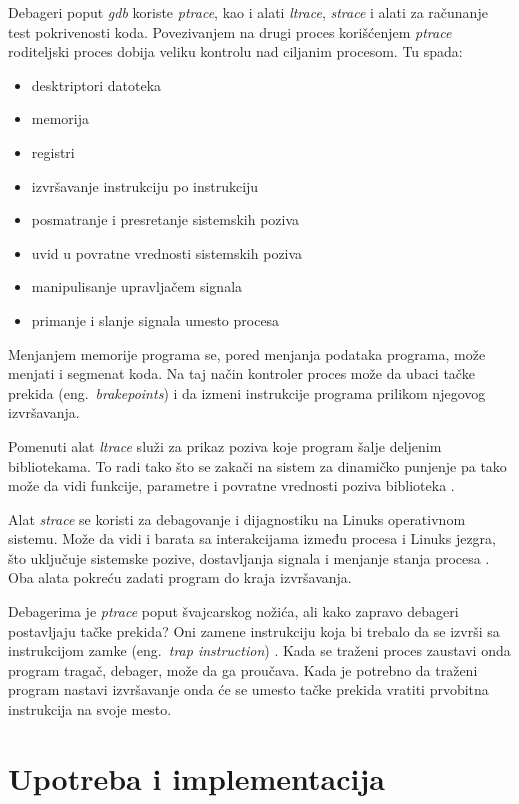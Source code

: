 \documentclass[a4paper]{article}
\begin{document}
Debageri poput \emph{gdb} koriste \emph{ptrace}, kao i alati \emph{ltrace}, \emph{strace} i alati za računanje test pokrivenosti koda.
Povezivanjem na drugi proces korišćenjem \emph{ptrace} roditeljski proces dobija veliku kontrolu nad ciljanim procesom.
Tu spada:
\begin{itemize}
    \item desktriptori datoteka
    \item memorija
    \item registri
    \item izvršavanje instrukciju po instrukciju
    \item posmatranje i presretanje sistemskih poziva
    \item uvid u povratne vrednosti sistemskih poziva
    \item manipulisanje upravljačem signala
    \item primanje i slanje signala umesto procesa
\end{itemize}

Menjanjem memorije programa se, pored menjanja podataka programa, može menjati i segmenat koda. 
Na taj način kontroler proces može da ubaci tačke prekida  (eng.~{\em brakepoints}) i da izmeni instrukcije 
programa prilikom njegovog izvršavanja.

Pomenuti alat \emph{ltrace} služi za prikaz poziva koje program šalje deljenim bibliotekama. To radi tako što se zakači na sistem
za dinamičko punjenje pa tako može da vidi funkcije, parametre i povratne vrednosti poziva biblioteka \cite{lman}.

Alat \emph{strace} se koristi za debagovanje i dijagnostiku na Linuks operativnom sistemu. 
Može da vidi i barata sa interakcijama između procesa i Linuks jezgra, što uključuje sistemske pozive, dostavljanja signala 
i menjanje stanja procesa \cite{sman}.
Oba alata pokreću zadati program do kraja izvršavanja.

Debagerima je \emph{ptrace} poput švajcarskog nožića, ali kako zapravo debageri postavljaju tačke prekida? 
Oni zamene instrukciju koja bi trebalo da se izvrši sa instrukcijom zamke 
(eng.~{\em trap instruction}) \cite{journal}. Kada se traženi proces zaustavi onda program tragač, debager, može da
ga proučava. Kada je potrebno da traženi program nastavi izvršavanje onda će se umesto tačke prekida vratiti 
prvobitna instrukcija na svoje mesto.

\section{Upotreba i implementacija}
\end{document}
